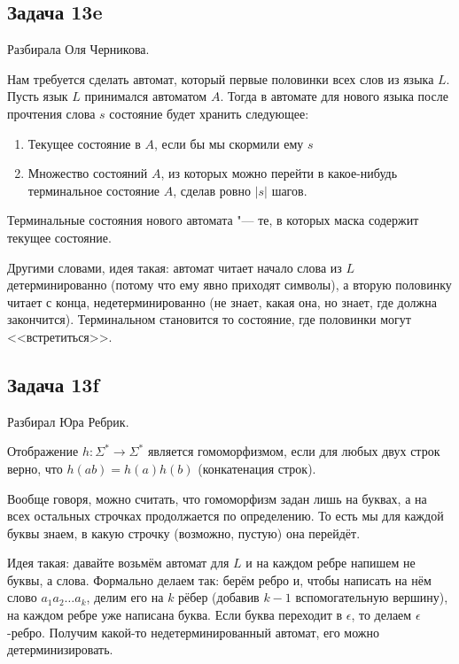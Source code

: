 \subsection{Задача 13e}\label{prob13e}
	Разбирала Оля Черникова.

	Нам требуется сделать автомат, который первые половинки всех слов из языка $L$.
	Пусть язык $L$ принимался автоматом $A$.
	Тогда в автомате для нового языка после прочтения слова $s$ состояние будет хранить следующее:
	\begin{enumerate}
		\item Текущее состояние в $A$, если бы мы скормили ему $s$
		\item Множество состояний $A$, из которых можно перейти в какое-нибудь терминальное состояние $A$, сделав ровно $|s|$ шагов.
	\end{enumerate}
	Терминальные состояния нового автомата "--- те, в которых маска содержит текущее состояние.

	Другими словами, идея такая: автомат читает начало слова из $L$ детерминированно (потому что ему явно приходят символы),
	а вторую половинку читает с конца, недетерминированно (не знает, какая она, но знает, где должна закончится).
	Терминальном становится то состояние, где половинки могут <<встретиться>>.

\subsection{Задача 13f}
	Разбирал Юра Ребрик.
	
	\begin{Def}
		Отображение $h \colon \Sigma^* \to \Sigma^* $ является гомоморфизмом, если для любых двух строк верно,
		что $h(ab)=h(a)h(b)$ (конкатенация строк).
	\end{Def}
	\begin{Rem}
		Вообще говоря, можно считать, что гомоморфизм задан лишь на буквах, а на всех остальных строчках продолжается по определению.
		То есть мы для каждой буквы знаем, в какую строчку (возможно, пустую) она перейдёт.
	\end{Rem}

	Идея такая: давайте возьмём автомат для $L$ и на каждом ребре напишем не буквы, а слова.
	Формально делаем так: берём ребро и, чтобы написать на нём слово $a_1a_2\dots a_k$, делим его на $k$ рёбер
	(добавив $k-1$ вспомогательную вершину), на каждом ребре уже написана буква.
	Если буква переходит в $\epsilon$, то делаем $\epsilon$-ребро.
	Получим какой-то недетерминированный автомат, его можно детерминизировать.

